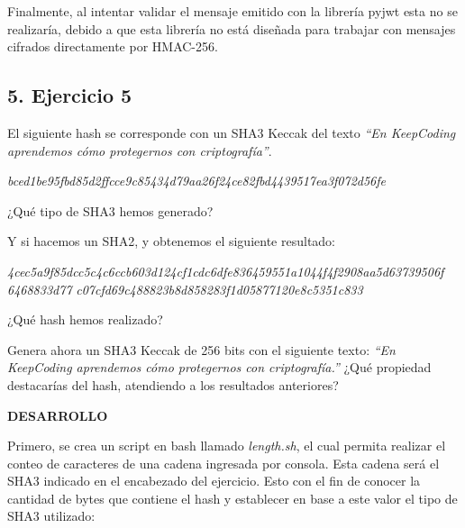 \documentclass[12pt,oneside,a4paper]{book}
\newcommand{\newsection}[1]{{\subsection*{#1}
\addcontentsline{toc}{section}{#1}}}
\begin{document}
\vspace{1em}

\hspace{20pt}
Finalmente, al intentar validar el mensaje emitido con la librería pyjwt esta no se realizaría, debido a que esta librería no está diseñada para trabajar con mensajes cifrados directamente por HMAC-256.

\newpage

\newsection{5. Ejercicio 5}

\vspace{2em}

El siguiente hash se corresponde con un SHA3 Keccak del texto \textit{“En KeepCoding aprendemos cómo protegernos con criptografía”}.

\vspace{1em}

\textit{bced1be95fbd85d2ffcce9c85434d79aa26f24ce82fbd4439517ea3f072d56fe}

\vspace{1em}

¿Qué tipo de SHA3 hemos generado?

\vspace{1em}

Y si hacemos un SHA2, y obtenemos el siguiente resultado:

\vspace{1em}

\textit{4cec5a9f85dcc5c4c6ccb603d124cf1cdc6dfe836459551a1044f4f2908aa5d63739506f
6468833d77}
\newline
\textit{c07cfd69c488823b8d858283f1d05877120e8c5351c833}

\vspace{1em}

¿Qué hash hemos realizado?

\vspace{1em}

Genera ahora un SHA3 Keccak de 256 bits con el siguiente texto: \textit{“En KeepCoding
aprendemos cómo protegernos con criptografía.”} ¿Qué propiedad destacarías del
hash, atendiendo a los resultados anteriores?

\vspace{2em}

\hspace{20pt} \textbf{DESARROLLO}

\vspace{1em}

\hspace{20pt}
Primero, se crea un script en bash llamado \textit{length.sh}, el cual permita realizar el conteo de caracteres de una cadena ingresada por consola. Esta cadena será el SHA3 indicado en el encabezado del ejercicio. Esto con el fin de conocer la cantidad de bytes que contiene el hash y establecer en base a este valor el tipo de SHA3 utilizado:
\end{document}

